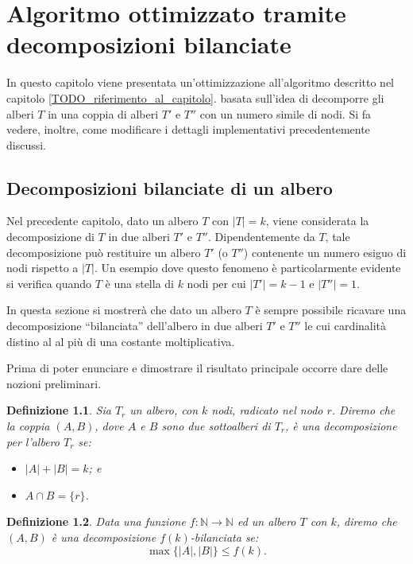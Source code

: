 \chapter{Algoritmo ottimizzato tramite decomposizioni bilanciate}
\label{cap:3}
In questo capitolo viene presentata un'ottimizzazione all'algoritmo descritto nel capitolo \ref{TODO_riferimento_al_capitolo}. %
basata sull'idea di decomporre gli alberi $T$ in una coppia di alberi $T'$ e $T''$ con un numero simile di nodi.
Si fa vedere, inoltre, come modificare i dettagli implementativi precedentemente discussi.

\section{Decomposizioni bilanciate di un albero}
\label{cap:3 par:1}
Nel precedente capitolo, dato un albero $ T $ con $|T|=k$, viene considerata la decomposizione di $T$ in due alberi $ T' $ e $ T''$. 
Dipendentemente da $T$, tale decomposizione può restituire un albero $T'$ (o $T''$) contenente un numero esiguo di nodi rispetto a $|T|$.
Un esempio dove questo fenomeno è particolarmente evidente si verifica quando $T$ è una stella di $k$ nodi per cui $|T'|=k-1$ e $|T''|=1$.

In questa sezione si mostrerà che dato un albero $T$ \`e sempre possibile ricavare una decomposizione ``bilanciata'' dell'albero  in due alberi $ T' $ e $ T'' $ le cui cardinalit\`a distino al al più di una costante moltiplicativa.

Prima di poter enunciare e dimostrare il risultato principale occorre dare delle nozioni preliminari.

\newtheorem{definizione}{Definizione}[section]

\begin{definizione}
	\label{definizioneDeco} 
Sia $T_r$ un albero, con $k$ nodi, radicato nel nodo $r$.
Diremo che la coppia $(A,B)$, dove  $A$ e $B$ sono due sottoalberi di $T_r$, \`e una decomposizione per l'albero $ T_r $ se:
\begin{itemize}
	\item $| A | + | B | = k$; e
	\item $A \cap B = \{r\}$. %
\end{itemize}
\end{definizione}


\begin{definizione}
\label{lemmaDeco}
Data una funzione $f : \mathbb{N} \to \mathbb{N}$ ed un albero $ T $ con $ k $, diremo che $ (A,B) $ \`e una decomposizione $ f(k) $-bilanciata se:
\begin{equation*}
	\max{ \{|A| , |B| \} }  \le  f(k).
\end{equation*}
\end{definizione}



